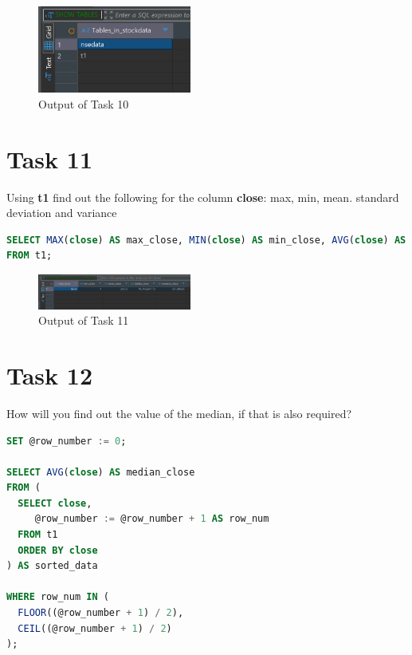 \documentclass{article}
\begin{document}
\begin{figure}[H]
	\centering
	\includegraphics[width=0.45\textwidth]{Images/Task10-2.png}
	\caption{Output of Task 10}
\end{figure}

\clearpage

\section*{Task 11}

\begin{task*}[11]
Using \textbf{t1} find out the following for the column \textbf{close}: max, min, mean. standard deviation and variance
\end{task*}

\begin{lstlisting}[language=SQL, caption=Finding Statistics for the close Column]
SELECT MAX(close) AS max_close, MIN(close) AS min_close, AVG(close) AS mean_close, STDDEV(close) AS stddev_close, VARIANCE(close) AS variance_close
FROM t1;
\end{lstlisting}

\begin{figure}[H]
	\centering
	\includegraphics[width=0.45\textwidth]{Images/Task11.png}
	\caption{Output of Task 11}
\end{figure}

\section*{Task 12}

\begin{task*}[12]
How will you find out the value of the median, if that is also required?
\end{task*}

\begin{lstlisting}[language=SQL, caption=Finding the Median for the close Column]
SET @row_number := 0;

SELECT AVG(close) AS median_close
FROM (
  SELECT close,
     @row_number := @row_number + 1 AS row_num
  FROM t1
  ORDER BY close
) AS sorted_data

WHERE row_num IN (
  FLOOR((@row_number + 1) / 2),
  CEIL((@row_number + 1) / 2)
);
\end{lstlisting}
\end{document}
